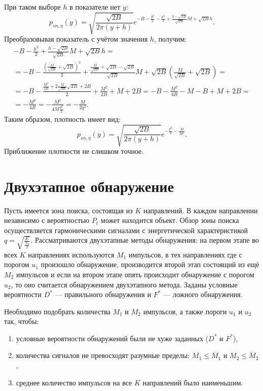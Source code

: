 \documentclass[a4paper,12pt]{article}
\begin{document}
    При таком выборе $h$ в показателе нет $y$:
    \[
        p_{sn,\eta}(y)
        = \sqrt{\frac{\sqrt{2 B}}{2 \pi (y + h)}} e^{- B - \frac{y^2}{2} - \frac{h^2}{2} + \frac{h - \sqrt{2 B}}{\sqrt{2 B}} M + \sqrt{2 B} h} .
    \]
    Преобразовывая показатель с учётом значения $h$, получим:
    \begin{multline*}
        - B - \frac{h^2}{2} + \frac{h - \sqrt{2 B}}{\sqrt{2 B}} M + \sqrt{2 B} h = \\
        = - B - \frac{\left ( \frac{M}{\sqrt{2 B}} + \sqrt{2 B} \right )^2}{2} + \frac{\frac{M}{\sqrt{2 B}} + \sqrt{2 B} - \sqrt{2 B}}{\sqrt{2 B}} M + \sqrt{2 B} \left ( \frac{M}{\sqrt{2 B}} + \sqrt{2 B} \right ) = \\
        = - B - \frac{\frac{M^2}{2 B} + 2 \frac{M}{\sqrt{2 B}} \sqrt{2 B} + 2 B}{2} + \frac{M^2}{2 B} + M + 2 B
        = - B - \frac{M^2}{4 B} - M - B + M + 2 B = \\
        = - \frac{M^2}{4 B}
        = - \frac{M^2}{4 M \frac{q^2}{2}}
        = - \frac{M}{2 q^2} .
    \end{multline*}
    Таким образом, плотность имеет вид:
    \[
        p_{sn,\eta}(y)
        = \sqrt{\frac{\sqrt{2 B}}{2 \pi (y + h)}} e^{- \frac{y^2}{2} - \frac{M}{2 q^2}} .
    \]
    Приближение плотности не слишком точное.


    \section{Двухэтапное обнаружение}
    Пусть имеется зона поиска, состоящая из $K$ направлений. В каждом направлении независимо с вероятностью $P_t$ может находится объект. Обзор зоны поиска осуществляется
    гармоническими сигналами с энергетической характеристикой $q = \sqrt{\frac{E}{\frac{N_0}{2}}}$. Рассматриваются двухэтапные методы обнаружения: на первом этапе во всех
    $K$ направлениях используются $M_1$ импульсов, в тех направлениях где с порогом $u_1$ произошло обнаружение, производится второй этап состоящий из ещё $M_2$ импульсов
    и если на втором этапе опять происходит обнаружение с порогом $u_2$, то оно считается обнаружением двухэтапного метода. Заданы условные вероятности $D^*$ ---
    правильного обнаружения и $F^*$ --- ложного обнаружения.

    Необходимо подобрать количества $M_1$ и $M_2$ импульсов, а также пороги $u_1$ и $u_2$ так, чтобы:
    \begin{enumerate}
        \item условные вероятности обнаружений были не хуже заданных ($D^*$ и $F^*$),
        \item количества сигналов не превосходят разумные пределы: $M_1 \le \overline{M}_1$ и $M_2 \le \overline{M}_2$,
        \item среднее количество импульсов на все $K$ направлений было наименьшим.
    \end{enumerate}
\end{document}
